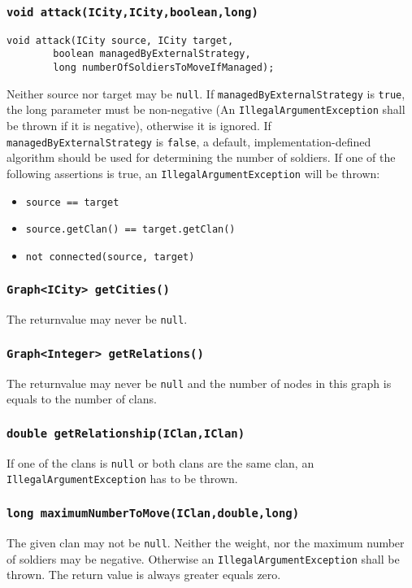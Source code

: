 \documentclass{article}
\begin{document}
\subsubsection{\texttt{void attack(ICity,ICity,boolean,long)}}
\begin{verbatim}
void attack(ICity source, ICity target,
		boolean managedByExternalStrategy,
		long numberOfSoldiersToMoveIfManaged);
\end{verbatim}
Neither source nor target may be \texttt{null}.
If \texttt{managedByExternalStrategy} is \texttt{true}, the long parameter must be non-negative (An \texttt{IllegalArgumentException} shall be thrown if it is negative), otherwise it is ignored.
If \texttt{managedByExternalStrategy} is \texttt{false}, a default, implementation-defined algorithm should be used for determining the number of soldiers.
If one of the following assertions is true, an \texttt{IllegalArgumentException} will be thrown:
\begin{itemize}
	\item \texttt{source == target}
	\item \texttt{source.getClan() == target.getClan()}
	\item \texttt{not connected(source, target)}
\end{itemize}

\subsubsection{\texttt{Graph<ICity> getCities()}}
The returnvalue may never be \texttt{null}.

\subsubsection{\texttt{Graph<Integer> getRelations()}}
The returnvalue may never be \texttt{null} and the number of nodes
in this graph is equals to the number of clans.

\subsubsection{\texttt{double getRelationship(IClan,IClan)}}
If one of the clans is \texttt{null} or both clans are the same clan,
an \texttt{IllegalArgumentException} has to be thrown.

\subsubsection{\texttt{long maximumNumberToMove(IClan,double,long)}}
The given clan may not be \texttt{null}. Neither the weight, nor the 
maximum number of soldiers may be negative.
Otherwise an \texttt{IllegalArgumentException} shall be thrown.
The return value is always greater equals zero.
\end{document}
